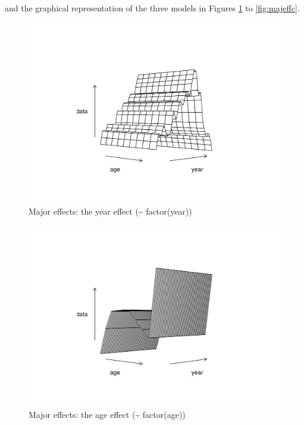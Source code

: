 \documentclass[
]{book}
\begin{document}
and the graphical representation of the three models in Figures \ref{fig:majeffy} to \ref{fig:majeffc}.

\begin{figure}
\centering
\includegraphics{_bookdown_files/_main_files/figure-html/majeffy-1.png}
\caption{\label{fig:majeffy}Major effects: the year effect (\textasciitilde{} factor(year))}
\end{figure}

\begin{figure}
\centering
\includegraphics{_bookdown_files/_main_files/figure-html/majeffa-1.png}
\caption{\label{fig:majeffa}Major effects: the age effect (\textasciitilde{} factor(age))}
\end{figure}
\end{document}
